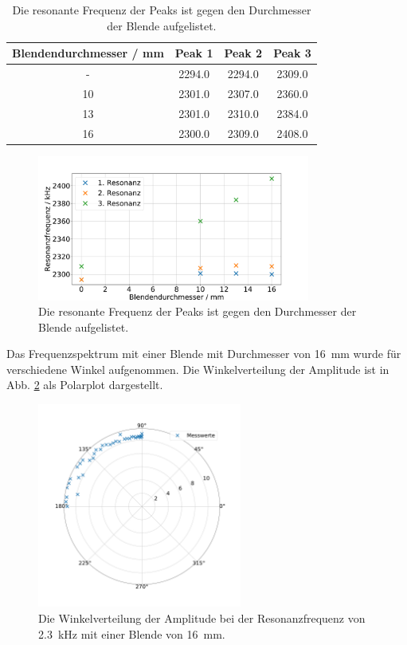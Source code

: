 \begin{table}\caption{Die resonante Frequenz der Peaks ist gegen den Durchmesser der Blende aufgelistet.}
    \label{tab:ende}
    \centering
     \begin{tabular}{c | c c c} 
    \toprule
{Blendendurchmesser / \si{\milli\meter}} & {Peak 1} & {Peak 2} & {Peak 3}   \\
\midrule
-  & 2294.0 & 2294.0 & 2309.0 \\ 
10 & 2301.0 & 2307.0 & 2360.0 \\
13 & 2301.0 & 2310.0 & 2384.0 \\
16 & 2300.0 & 2309.0 & 2408.0 \\
\bottomrule
\end{tabular}\end{table}

\begin{figure}
    \centering
    \includegraphics[width=0.8\textwidth]{plots/D_2.pdf}
    \caption{Die resonante Frequenz der Peaks ist gegen den Durchmesser der Blende aufgelistet.}
    \label{fig:resonanzen}
\end{figure}

Das Frequenzspektrum mit einer Blende mit Durchmesser von \SI{16}{\milli\metre} wurde für verschiedene Winkel aufgenommen. Die Winkelverteilung der Amplitude ist in Abb. \ref{fig:polar_molekuel} als Polarplot dargestellt. 

\begin{figure}
    \centering
    \includegraphics[width=0.6\textwidth]{plots/D_3.pdf}
    \caption{Die Winkelverteilung der Amplitude bei der Resonanzfrequenz von \SI{2.3}{\kilo\hertz} mit einer Blende von \SI{16}{\milli\metre}.}
    \label{fig:polar_molekuel}
\end{figure}

